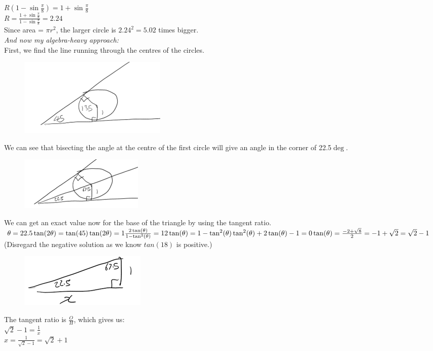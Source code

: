 \documentclass[../main.tex]{subfiles}
\begin{document}
\begin{enumerate}
    \(R(1-\sin{\frac{\pi}{8}})=1+\sin{\frac{\pi}{8}}\)\\

    \(R=\frac{1+\sin{\frac{\pi}{8}}}{1-\sin{\frac{\pi}{8}}}=2.24\)\\

    Since area = \(\pi r^2\), the larger circle is \(2.24^2=5.02\) times bigger.\\
    
    \textit{And now my algebra-heavy approach:}\\
    First, we find the line running through the centres of the circles.
    \begin{figure}[H]
        \centering
        \includegraphics[width=0.25\linewidth]{images/t1w8q3_ans1.png}
    \end{figure}
    We can see that bisecting the angle at the centre of the first circle will give an angle in the corner of 22.5$\deg$.
    \begin{figure}[H]
        \centering
        \includegraphics[width=0.25\linewidth]{images/t1w8q3_ans2.png}
    \end{figure}
    We can get an exact value now for the base of the triangle by using the tangent ratio.\\
    \(
    \theta=22.5\\
    \tan(2\theta)=\tan(45)\\
    \tan(2\theta)=1\\
    \frac{2\tan(\theta)}{1-\tan^2(\theta)}=1\\
    2\tan(\theta)=1-\tan^2(\theta)\\
    \tan^2(\theta)+2\tan(\theta)-1=0\\
    \tan(\theta)=\frac{-2+\sqrt{8}}{2}=-1+\sqrt{2}=\sqrt{2}-1\\
    \)
    (Disregard the negative solution as we know \(tan(18)\) is positive.)\\
    \begin{figure}[H]
        \centering
        \includegraphics[width=0.25\linewidth]{images/t1w8q3_ans3.png}
    \end{figure}
    The tangent ratio is \(\frac{O}{H}\), which gives us:\\
    \(\sqrt{2}-1=\frac{1}{x}\)\\
    \(x=\frac{1}{\sqrt{2}-1}=\sqrt{2}+1\)\\


\end{enumerate}
\end{document}
